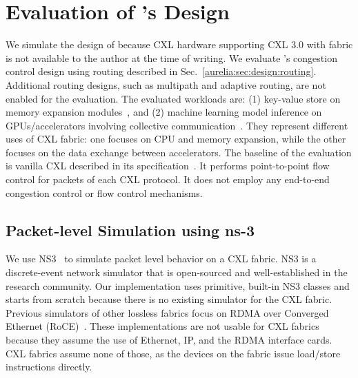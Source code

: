 \section{Evaluation of \aurelia's Design}
\label{aurelia:sec:eval}
%
We simulate the design of \aurelia because CXL hardware supporting CXL 3.0 with fabric is not available to the author at the time of writing.
%
We evaluate \aurelia's congestion control design using routing described in Sec.~\ref{aurelia:sec:design:routing}. 
%
Additional routing designs, such as multipath and adaptive routing, are not enabled for the evaluation.
%
The evaluated workloads are: (1) key-value store on memory expansion modules~\cite{samsung-memory-expander:hcs:2022}, and (2) machine learning model inference on GPUs/accelerators involving collective communication~\cite{aws-inferentia:2019}.
%
They represent different uses of CXL fabric: one focuses on CPU and memory expansion, while the other focuses on the data exchange between accelerators.
%
The baseline of the evaluation is vanilla CXL described in its specification~\cite{cxl-3-0-spec}.
%
It performs point-to-point flow control for packets of each CXL protocol.
%
It does not employ any end-to-end congestion control or flow control mechanisms.
%


\subsection{Packet-level Simulation using ns-3}
\label{aurelia:sec:eval:ns3-simulation}
We use NS3~\cite{ns-3} to simulate packet level behavior on a CXL fabric.
%  
NS3 is a discrete-event network simulator that is open-sourced and well-established in the research community. 
%
Our implementation uses primitive, built-in NS3 classes and starts from scratch because there is no existing simulator for the CXL fabric. 
%
Previous simulators of other lossless fabrics focus on RDMA over Converged Ethernet (RoCE)~\cite{dcqcn:sigcomm:2015, hpcc:sigcomm:2019,pint:sigcomm:2020}.
%
These implementations are not usable for CXL fabrics because they assume the use of Ethernet, IP, and the RDMA interface cards.
%
CXL fabrics assume none of those, as the devices on the fabric issue load/store instructions directly.   
%

